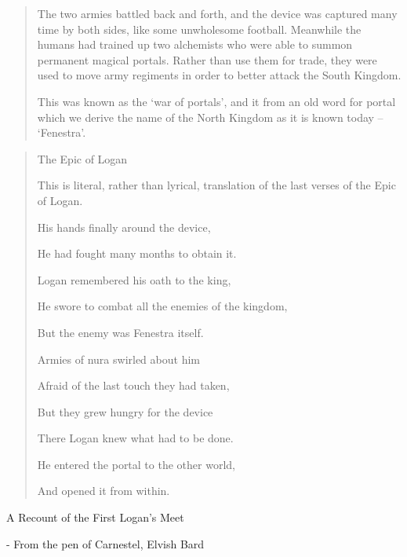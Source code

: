 \begin{quotation}
	The two armies battled back and forth, and the device was captured many time by both sides, like some unwholesome football.  Meanwhile the humans had trained up two alchemists who were able to summon permanent magical portals.  Rather than use them for trade, they were used to move army regiments in order to better attack the South Kingdom.

	This was known as the `war of portals', and it from an old word for portal which we derive the name of the North Kingdom as it is known today -- `Fenestra'.
\end{quotation}


\begin{verse}
The Epic of Logan

This is literal, rather than lyrical, translation of the last verses of the Epic of Logan.

His hands finally around the device,

He had fought many months to obtain it.

Logan remembered his oath to the king,

He swore to combat all the enemies of the kingdom,

But the enemy was Fenestra itself.

Armies of nura swirled about him

Afraid of the last touch they had taken,

But they grew hungry for the device

There Logan knew what had to be done.

He entered the portal to the other world,

And opened it from within.

\end{verse}

A Recount of the First Logan's Meet

	- From the pen of Carnestel, Elvish Bard


